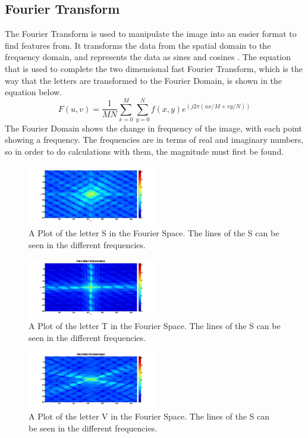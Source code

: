 \documentclass[a4paper]{article}
\begin{document}
\subsection{Fourier Transform}
The Fourier Transform is used to manipulate the image into an easier format to find features from. It transforms the data from the spatial domain to the frequency domain, and represents the data as sines and cosines \cite{FFT}. The equation that is used to complete the two dimensional fast Fourier Transform, which is the way that the letters are transformed to the Fourier Domain, is shown in the equation below. %
\begin{displaymath} F(u,v) = \frac{1}{MN}\sum\limits_{x=0}^M\sum\limits_{y=0}^Nf(x,y)e^{(j2\pi(ux/M+vy/N))}\end{displaymath}
The Fourier Domain shows the change in frequency of the image, with each point showing a frequency. The frequencies are in terms of real and imaginary numbers, so in order to do calculations with them, the magnitude must first be found. 
\begin{figure}[H]
\centering
\includegraphics[width=0.5\textwidth]{plotS.png}
\caption{\label{fig:plotS}A Plot of the letter S in the Fourier Space. The lines of the S can be seen in the different frequencies.}
\end{figure}
\begin{figure}[H]
\centering
\includegraphics[width=0.5\textwidth]{plotT.png}
\caption{\label{fig:plotT}A Plot of the letter T in the Fourier Space. The lines of the S can be seen in the different frequencies.}
\end{figure}
\begin{figure}[H]
\centering
\includegraphics[width=0.5\textwidth]{plotV.png}
\caption{\label{fig:plotV}A Plot of the letter V in the Fourier Space. The lines of the S can be seen in the different frequencies.}
\end{figure}
\end{document}
